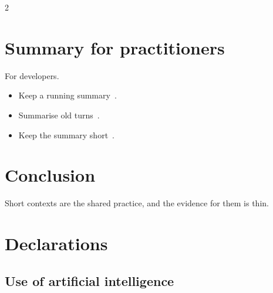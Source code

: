 \documentclass[10pt,a4paper]{article}
\begin{document}
\begin{multicols*}{2}
\section{Summary for practitioners}\label{sec:summary-for-practitioners}

For developers.
\begin{itemize}
\item Keep a running summary~\cite{ana2025managing}.
\item Summarise old turns~\cite{ana2025managing}.
\item Keep the summary short~\cite{ana2025managing}.
\end{itemize}

\section{Conclusion}\label{sec:conclusion}

Short contexts are the shared practice, and the evidence for them is thin.

\section{Declarations}\label{sec:declarations}

\subsection{Use of artificial intelligence}\label{sec:use-of-artificial-intelligence}


\end{multicols*}
\end{document}
